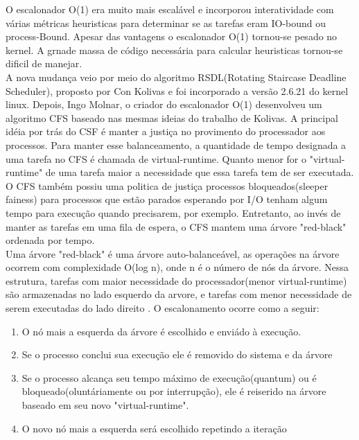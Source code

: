 \documentclass[conference]{IEEEtran}
\begin{document}
 O escalonador O(1) era muito mais escalável e incorporou interatividade com várias métricas heuristicas para determinar se as tarefas eram IO-bound ou process-Bound. Apesar das vantagens o escalonador O(1) tornou-se pesado no kernel. A grnade massa de código necessária para calcular heuristicas tornou-se dificil de manejar.\\

 A nova mudança veio por meio do algoritmo RSDL(Rotating Staircase Deadline Scheduler), proposto por Con Kolivas e foi incorporado a versão 2.6.21 do kernel linux. Depois, Ingo Molnar, o criador do escalonador O(1) desenvolveu um algoritmo CFS baseado nas mesmas ideias do trabalho de Kolivas. A principal idéia por trás do CSF é manter a justiça no provimento do processador aos processos. Para manter esse balanceamento, a quantidade de tempo designada a uma tarefa no CFS é chamada de virtual-runtime. Quanto menor for o "virtual-runtime" de uma tarefa maior a necessidade que essa tarefa tem de ser executada.\\
 
O CFS também possiu uma politica de justiça processos bloqueados(sleeper fainess) para processos que estão parados esperando por I/O tenham algum tempo para execução quando precisarem, por exemplo. Entretanto, ao invés de manter as tarefas em uma fila de espera, o CFS mantem uma árvore "red-black" ordenada por tempo.\\

Uma árvore "red-black" é uma árvore auto-balanceável, as operações na árvore ocorrem com complexidade O(log n), onde n é o número de nós da árvore. Nessa estrutura, tarefas com maior necessidade do processador(menor virtual-runtime) são armazenadas no lado esquerdo da arvore, e tarefas com menor necessidade de serem executadas do lado direito \cite{LinuxSchedulerIBM}. O escalonamento ocorre como a seguir:
\begin{enumerate}
	\item O nó mais a esquerda da árvore é escolhido e enviádo à execução.
	\item Se o processo conclui sua execução ele é removido do sistema e da árvore
	\item Se o processo alcança seu tempo máximo de execução(quantum) ou é bloqueado(oluntáriamente ou por interrupção), ele é reiserido na árvore baseado em seu novo "virtual-runtime".
	\item O novo nó mais a esquerda será escolhido repetindo a iteração\cite{LinuxSchedulerWiki}
\end{enumerate}
\end{document}
